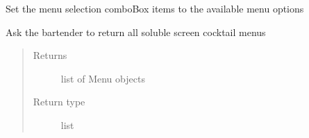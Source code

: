 \documentclass[letterpaper,10pt,english]{sphinxmanual}
\begin{document}
\begin{fulllineitems}
\begin{fulllineitems}
\begin{quote}
\begin{description}
\end{description}\end{quote}

\end{fulllineitems}


\begin{fulllineitems}
\label{\detokenize{polo.windows:polo.windows.run_importer_dialog.RunImporterDialog.set_menu_options}}
Set the menu selection comboBox items to the available menu options

\end{fulllineitems}


\begin{fulllineitems}
\label{\detokenize{polo.windows:polo.windows.run_importer_dialog.RunImporterDialog.show_rar_popup}}
\end{fulllineitems}


\begin{fulllineitems}
\label{\detokenize{polo.windows:polo.windows.run_importer_dialog.RunImporterDialog.soluble_menus}}
Ask the bartender to return all soluble screen cocktail menus
\begin{quote}\begin{description}
\item[{Returns}] \leavevmode
list of Menu objects

\item[{Return type}] \leavevmode
list

\end{description}\end{quote}


\end{fulllineitems}
\end{fulllineitems}
\end{document}
